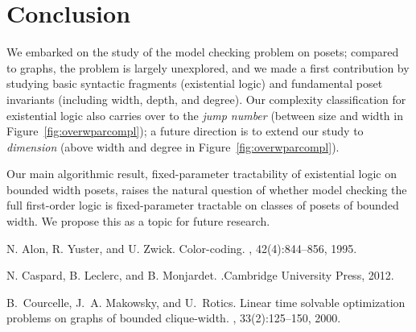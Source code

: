 \documentclass[usletter]{article}
\newcommand{\longversion}[1]{#1}
\newcommand{\shortversion}[1]{}
\begin{document}
{\section{Conclusion}\label{sect:concl}

We embarked on the study of the model checking problem 
on 
posets; compared to graphs, 
the problem is largely unexplored, and we made a first contribution 
by studying basic syntactic fragments (existential logic) 
and fundamental poset invariants (including width, depth, and degree).  
Our complexity classification for existential logic also carries over to the \emph{jump number} 
(between size and width in Figure~\ref{fig:overwparcompl}); a future direction is to extend our study to \emph{dimension} 
(above width \cite{CaspardLeclercMonjardet12} and degree \cite{FurediKahn86} in Figure~\ref{fig:overwparcompl}).


Our main algorithmic result, fixed-parameter tractability of existential logic on bounded width posets, 
raises the natural question of whether model checking the full first-order logic 
is fixed-parameter tractable on classes of posets of bounded width. 
We propose this as a topic for future research.  










\shortversion{\acks

This research was supported by ERC Starting Grant (Complex Reason, 239962) 
and FWF Austrian Science Fund (Parameterized Compilation, P26200).}







\longversion{\newpage}

\begin{thebibliography}{10}
\shortversion{\softraggedright}

N. Alon, R. Yuster, and U. Zwick.
\newblock Color-coding.
, 42(4):844--856, 1995.



N. Caspard, B. Leclerc, and B. Monjardet.
.\newblock Cambridge University Press, 2012.



B.~Courcelle, J.~A. Makowsky, and U.~Rotics.
\newblock Linear time solvable optimization problems on graphs of bounded
  clique-width.
, 33(2):125--150, 2000.


\end{thebibliography}}
\end{document}
